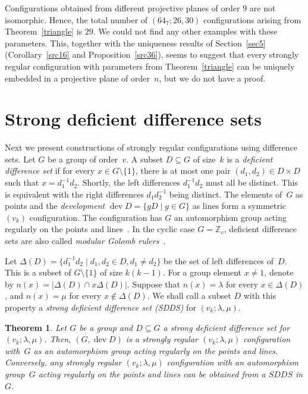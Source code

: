 \documentclass[12pt, reqno]{amsart}
\newtheorem{theorem}{Theorem}[section]
\def\Z{\mathbb{Z}}
\def\dev{\mathop{\mathrm{dev}}}
\begin{document}
Configurations obtained from different projective planes of order $9$ are not isomorphic.
Hence, the total number of $(64_7;26,30)$ configurations arising from Theorem~\ref{triangle}
is $29$. We could not find any other examples with these parameters.
This, together with the uniqueness results of Section~\ref{sec5} (Corollary~\ref{src16}
and Proposition~\ref{src36}), seems to suggest that every strongly regular configuration
with parameters from Theorem~\ref{triangle} can be uniquely embedded in a projective plane
of order~$n$, but we do not have a proof.


\section{Strong deficient difference sets}\label{sec4}

Next we present constructions of strongly regular configurations
using difference sets. Let $G$ be a group of order~$v$. A subset
$D\subseteq G$ of size~$k$ is a \emph{deficient difference set}
if for every $x\in G\setminus\{1\}$, there is at most one pair
$(d_1,d_2)\in D\times D$ such that $x=d_1^{-1}d_2$.
Shortly, the left differences $ d_1^{-1}d_2$ must all be distinct.
This is equivalent with the right differences $d_1 d_2^{-1}$ being
distinct. The elements of~$G$ as points and the \emph{development}
$\dev D=\{gD \mid g\in G\}$ as lines form a symmetric $(v_k)$
configuration. The configuration has $G$ an automorphism group
acting regularly on the points and lines~\cite{MF08, MPW87}. In
the cyclic case $G=\Z_v$, deficient difference sets are also called
\emph{modular Golomb rulers}~\cite{BS21}.

Let $\Delta(D)=\{d_1^{-1}d_2 \mid d_1,d_2\in D, d_1\neq d_2\}$ be
the set of left differences of~$D$. This is a subset of $G\setminus
\{1\}$ of size $k(k-1)$. For a group element $x\neq 1$, denote by
$n(x)=|\Delta(D)\cap x\Delta(D)|$. Suppose that $n(x)=\lambda$ for
every $x\in \Delta(D)$, and $n(x)=\mu$ for every $x\not\in
\Delta(D)$. We shall call a subset $D$ with this property a
\emph{strong deficient difference set (SDDS)} for
$(v_k;\lambda,\mu)$.

\begin{theorem} Let $G$ be a group and
$D\subseteq G$ a strong deficient difference set for
$(v_k;\lambda,\mu)$. Then, $(G,\dev D)$ is a strongly regular $(v_k;\lambda,\mu)$
configuration with~$G$ as an automorphism group acting regularly on the points
and lines. Conversely, any strongly regular $(v_k;\lambda,\mu)$ configuration with
an automorphism group~$G$ acting regularly on the points and lines can be obtained
from a $SDDS$ in $G$.
\end{theorem}
\end{document}

